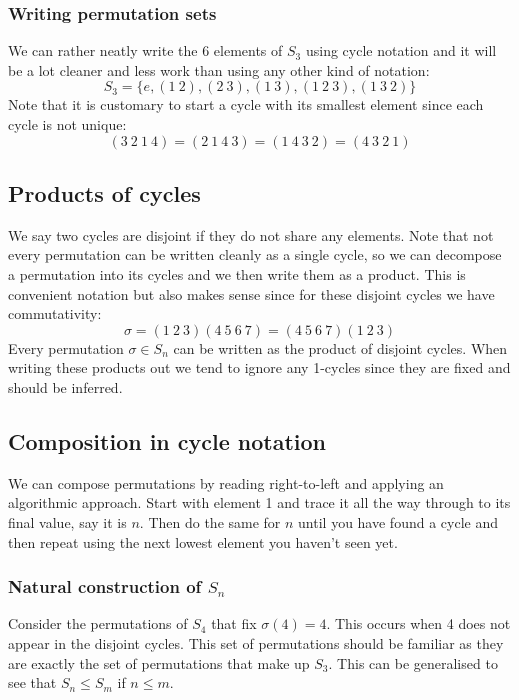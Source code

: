 \documentclass[12pt]{article}
\begin{document}
\subsubsection*{Writing permutation sets}
We can rather neatly write the 6 elements of \(S_3\) using cycle notation and it will be a lot cleaner and less work than using any other kind of notation:
\[S_3=\{e,(1\ 2), (2\ 3),(1\ 3),(1\ 2\ 3),(1\ 3\ 2)\}\]
Note that it is customary to start a cycle with its smallest element since each cycle is not unique:
\[(3\ 2\ 1\ 4)=(2\ 1\ 4\ 3)=(1\ 4\ 3\ 2)=(4\ 3\ 2\ 1)\]
\subsection*{Products of cycles}
We say two cycles are disjoint if they do not share any elements. Note that not every permutation can be written cleanly as a single cycle, so we can decompose a permutation into its cycles and we then write them as a product. This is convenient notation but also makes sense since for these disjoint cycles we have commutativity:
\[\sigma = (1 \ 2\ 3)(4\ 5\ 6\ 7)=(4\ 5\ 6\ 7)(1\ 2\ 3)\]
Every permutation \(\sigma\in S_n\) can be written as the product of disjoint cycles. When writing these products out we tend to ignore any 1-cycles since they are fixed and should be inferred.
\subsection*{Composition in cycle notation}
We can compose permutations by reading right-to-left and applying an algorithmic approach. Start with element 1 and trace it all the way through to its final value, say it is \(n\). Then do the same for \(n\) until you have found a cycle and then repeat using the next lowest element you haven't seen yet.
\subsubsection*{Natural construction of \(S_n\)}
Consider the permutations of \(S_4\) that fix \(\sigma(4)=4\). This occurs when 4 does not appear in the disjoint cycles. This set of permutations should be familiar as they are exactly the set of permutations that make up \(S_3\). This can be generalised to see that \(S_n\leqslant S_m\) if \(n\leq m\).
\end{document}
